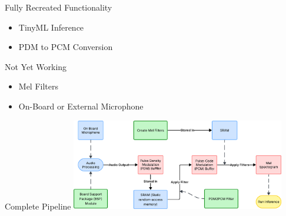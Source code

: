\maketitle

\begin{frame}{Fully Recreated Functionality}
    \begin{itemize}
        \item TinyML Inference
        \item PDM to PCM Conversion
    \end{itemize}    
\end{frame}

\begin{frame}{Not Yet Working}
    \begin{itemize}
        \item Mel Filters
        \item On-Board or External Microphone
    \end{itemize}    
\end{frame}

\begin{frame}{Complete Pipeline}
    \centering
    \includegraphics[height=0.7\textheight,width=0.7\textwidth,keepaspectratio]{pipeline.png}
\end{frame}

